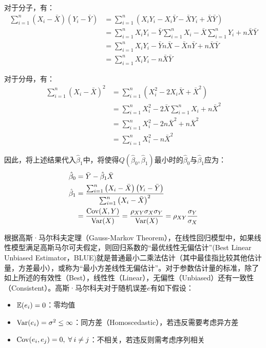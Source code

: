 \documentclass[11pt]{article}
\begin{document}
对于分子，有：
\begin{align*}
    \sum_{i=1}^{n} \left(X_i - \bar{X}\right) \left(Y_i - \bar{Y}\right)
    &= \sum_{i=1}^{n} \left( X_i Y_i - X_i\bar{Y} - \bar{X}Y_i + \bar{X}\bar{Y} \right) \\
    &=\sum_{i=1}^{n} X_i Y_i - \bar{Y} \sum_{i=1}^{n} X_i - \bar{X} \sum_{i=1}^{n} Y_i + n\bar{X}\bar{Y} \\
    &=\sum_{i=1}^{n} X_i Y_i - \bar{Y} n \bar{X} - \bar{X} n \bar{Y} + n\bar{X}\bar{Y} \\
    &=\sum_{i=1}^{n} X_i Y_i - n\bar{X}\bar{Y}
\end{align*}

对于分母，有：
\begin{align*}
    \sum_{i=1}^{n} \left(X_i - \bar{X}\right)^2
    &= \sum_{i=1}^{n} \left( X_i^2 - 2 X_i\bar{X} + \bar{X}^2 \right) \\
    &= \sum_{i=1}^{n} X_i^2 - 2 \bar{X} \sum_{i=1}^{n} X_i + n\bar{X}^2 \\
    &= \sum_{i=1}^{n} X_i^2 - 2 n \bar{X}^2 + n\bar{X}^2 \\
    &= \sum_{i=1}^{n} X_i^2 - n \bar{X}^2 
\end{align*}

因此，将上述结果代入$\hat{\beta}_1$中，将使得$Q(\hat{\beta}_0,\hat{\beta}_1)$最小时的$\hat{\beta}_0$与$\hat{\beta}_1$应为：
\begin{align*}
    \hat{\beta}_0 &= \bar{Y} - \hat{\beta}_1 \bar{X} \\
    \hat{\beta}_1 &= \frac{\sum_{i=1}^{n} \left(X_i - \bar{X}\right) \left(Y_i - \bar{Y}\right)}{\sum_{i=1}^{n} \left(X_i - \bar{X}\right)^2} \\
    &= \frac{\operatorname{Cov}(X,Y)}{\operatorname{Var}(X)} = \frac{\rho_{XY} \sigma_X \sigma_Y}{\operatorname{Var}(X)} = \rho_{XY} \frac{\sigma_Y}{\sigma_X}
\end{align*}

根据高斯·马尔科夫定理（Gauss-Markov Theorem），在线性回归模型中，如果线性模型满足高斯马尔可夫假定，则回归系数的“最优线性无偏估计”(Best Linear Unbiased Estimator，BLUE)就是普通最小二乘法估计（其中最佳指比较其他估计量，方差最小），或称为“最小方差线性无偏估计”。对于参数估计量的标准，除了如上所述的有效性（Best），线性性（Linear），无偏性（Unbiased）还有一致性（Consistent）。高斯·马尔科夫对于随机误差$e$有如下假设：
\begin{itemize}
    \item $\mathbb{E}(e_i)=0$：零均值
    \item $\operatorname{Var}(e_i) = \sigma^2 \leq \infty$：同方差（Homoscedastic），若违反需要考虑异方差
    \item $\Cov(e_i,e_j) = 0,\; \forall i\neq j$：不相关，若违反则需考虑序列相关
\end{itemize}
\end{document}
